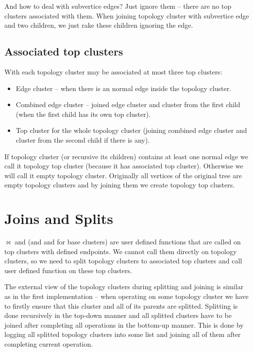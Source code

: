 And how to deal with subvertice edges? Just ignore them -- there are no top
clusters associated with them. When joining topology cluster with subvertice
edge and two children, we just rake these children ignoring the edge.

\subsection{Associated top clusters}

With each topology cluster may be associated at most three top clusters:
\begin{itemize}
\item {\I Edge cluster} -- when there is an normal edge inside the topology cluster.
\item {\I Combined edge cluster} -- joined {\I edge cluster} and cluster from
the first child (when the first child has its own top cluster).
\item {\I Top cluster} for the whole topology cluster (joining {\I combined edge
cluster} and cluster from the second child if there is any).
\end{itemize}

If topology cluster (or recursive its children) contains at least one normal
edge we call it {\I topology top cluster} (because it has associated top
cluster). Otherwise we will call it {\I empty topology cluster}. Originally all
vertices of the original tree are empty topology clusters and by joining them we
create topology top clusters.


\section{Joins and Splits}

$\Join$ and \Split{} (and \Create{} and \Destroy{} for base clusters) are user
defined functions that are called on top clusters with defined endpoints. We
cannot call them directly on topology clusters, so we need to split topology
clusters to associated top clusters and call user defined function on these top
clusters.

The external view of the topology clusters during splitting and joining is
similar as in the first implementation -- when operating on some topology
cluster we have to firstly ensure that this cluster and all of its parents are
splitted. Splitting is done recursively in the top-down manner and all splitted
clusters have to be joined after completing all operations in the bottom-up
manner. This is done by logging all splitted topology clusters into some list
and joining all of them after completing current operation.

